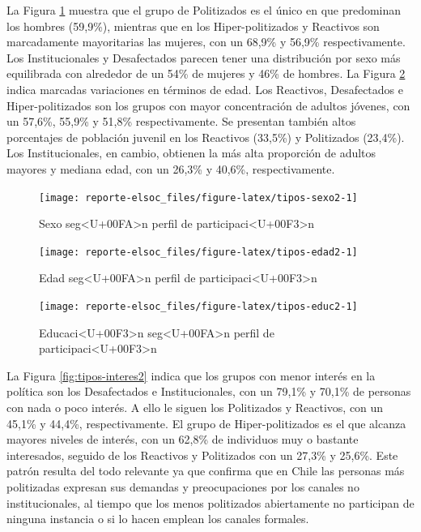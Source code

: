 \documentclass[
  12pt,
]{book}
\begin{document}
La Figura \ref{fig:tipos-sexo2} muestra que el grupo de Politizados es el único en que predominan los hombres (59,9\%), mientras que en los Hiper-politizados y Reactivos son marcadamente mayoritarias las mujeres, con un 68,9\% y 56,9\% respectivamente. Los Institucionales y Desafectados parecen tener una distribución por sexo más equilibrada con alrededor de un 54\% de mujeres y 46\% de hombres. La Figura \ref{fig:tipos-edad2} indica marcadas variaciones en términos de edad. Los Reactivos, Desafectados e Hiper-politizados son los grupos con mayor concentración de adultos jóvenes, con un 57,6\%, 55,9\% y 51,8\% respectivamente. Se presentan también altos porcentajes de población juvenil en los Reactivos (33,5\%) y Politizados (23,4\%). Los Institucionales, en cambio, obtienen la más alta proporción de adultos mayores y mediana edad, con un 26,3\% y 40,6\%, respectivamente.

\begin{figure}

{\centering \texttt{[image: reporte-elsoc\_files/figure-latex/tipos-sexo2-1]} 

}

\caption{Sexo seg<U+00FA>n perfil de participaci<U+00F3>n}\label{fig:tipos-sexo2}
\end{figure}

\begin{figure}

{\centering \texttt{[image: reporte-elsoc\_files/figure-latex/tipos-edad2-1]} 

}

\caption{Edad seg<U+00FA>n perfil de participaci<U+00F3>n}\label{fig:tipos-edad2}
\end{figure}

\begin{figure}

{\centering \texttt{[image: reporte-elsoc\_files/figure-latex/tipos-educ2-1]} 

}

\caption{Educaci<U+00F3>n seg<U+00FA>n perfil de participaci<U+00F3>n}\label{fig:tipos-educ2}
\end{figure}

La Figura \ref{fig:tipos-interes2} indica que los grupos con menor interés en la política son los Desafectados e Institucionales, con un 79,1\% y 70,1\% de personas con nada o poco interés. A ello le siguen los Politizados y Reactivos, con un 45,1\% y 44,4\%, respectivamente. El grupo de Hiper-politizados es el que alcanza mayores niveles de interés, con un 62,8\% de individuos muy o bastante interesados, seguido de los Reactivos y Politizados con un 27,3\% y 25,6\%. Este patrón resulta del todo relevante ya que confirma que en Chile las personas más politizadas expresan sus demandas y preocupaciones por los canales no institucionales, al tiempo que los menos politizados abiertamente no participan de ninguna instancia o si lo hacen emplean los canales formales.
\end{document}
